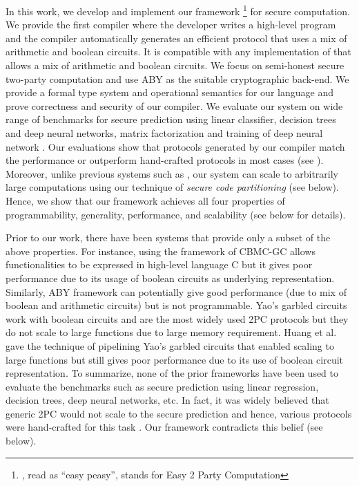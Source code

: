 In this work, we develop and implement our framework \tool\footnote{\tool, read as ``easy peasy'', stands for Easy 2 Party Computation} for secure
computation. We provide the first compiler where the developer writes a high-level program and the compiler automatically generates an efficient \mpc protocol that uses a
mix of arithmetic and boolean circuits. 
It is compatible with any implementation of \mpc that allows a mix of arithmetic and boolean circuits. 
We focus on semi-honest secure two-party computation and use ABY \cite{aby} as the suitable cryptographic back-end.
We provide a formal type system and operational semantics for our language and prove correctness and security of our compiler.
We evaluate our system on wide range of benchmarks for secure prediction \cite{shafindss,wu,barni,secureml,minionn,bonsai} using linear classifier, decision trees and deep neural networks, matrix factorization \cite{valeriaMatrix} and training of deep neural network \cite{secureml}. Our evaluations show that protocols generated by our compiler match
the performance or outperform hand-crafted protocols in most cases (see
).  Moreover, unlike previous systems such as \cite{wysteria,aby,cbmcgc}, our system can scale to arbitrarily large computations using our technique of {\em secure code partitioning} (see below). 
Hence, we show that our framework achieves all four properties of programmability, generality, performance, and scalability (see below for details). 

Prior to our work, there have been systems that provide only a subset of the above properties. For instance, using the framework of CBMC-GC \cite{cbmcgc} allows  functionalities to be expressed in high-level language C but it gives poor performance due to its usage of boolean circuits as underlying representation. Similarly, ABY \cite{aby} framework can potentially give good performance (due to mix of boolean and arithmetic circuits) but is not programmable. Yao's garbled circuits \cite{yao} work with boolean circuits and are the most widely used 2PC protocols but they  do not scale to large functions due to large memory requirement.
Huang et al. \cite{yao-pipe} gave the technique of pipelining Yao's garbled circuits that enabled scaling to large functions but still gives poor performance due to its use of boolean circuit representation. 
To summarize, none of the prior frameworks have been used to evaluate the benchmarks such as secure prediction using linear regression, decision trees, deep neural networks, etc. In fact, it was widely believed that generic 2PC would not scale to the secure prediction and hence, various protocols were hand-crafted for this task \cite{shafindss,wu,secureml,minionn}. Our framework contradicts this belief (see below).

